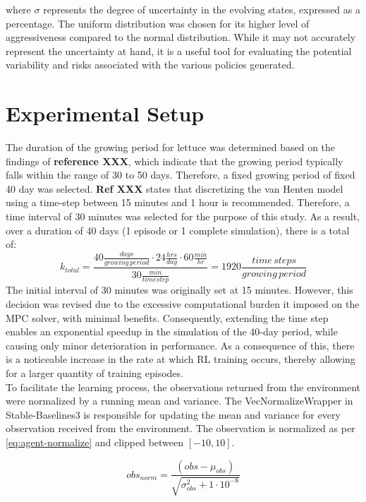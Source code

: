 where $\sigma$ represents the degree of uncertainty in the evolving states, expressed as a percentage. The uniform distribution was chosen for its higher level of aggressiveness compared to the normal distribution. While it may not accurately represent the uncertainty at hand, it is a useful tool for evaluating the potential variability and risks associated with the various policies generated.



\section{Experimental Setup}
The duration of the growing period for lettuce was determined based on the findings of \textbf{reference XXX}, which indicate that the growing period typically falls within the range of 30 to 50 days. Therefore, a fixed growing period of fixed 40 day was selected. \textbf{Ref XXX} states that discretizing the van Henten model using a time-step between 15 minutes and 1 hour is recommended. Therefore, a time interval of 30 minutes was selected for the purpose of this study. As a result, over a duration of 40 days (1 episode or 1 complete simulation), there is a total of:
$$
k_{total} = \frac{40 \frac{days}{growing \, period} \cdot 24 \frac{hrs}{day} \cdot 60 \frac{min}{hr}}{30 \frac{min}{timestep}} = 1920 \frac{time \, steps}{growing \, period}
$$
The initial interval of 30 minutes was originally set at 15 minutes. However, this decision was revised due to the excessive computational burden it imposed on the MPC solver, with minimal benefits. Consequently, extending the time step enables an exponential speedup in the simulation of the 40-day period, while causing only minor deterioration in performance. As a consequence of this, there is a noticeable increase in the rate at which RL training occurs, thereby allowing for a larger quantity of training episodes.
\\
To facilitate the learning process, the observations returned from the environment were normalized by a running mean and variance. The VecNormalizeWrapper in Stable-Baselines3 is responsible for updating the mean and variance for every observation received from the environment. The observation is normalized as per \autoref{eq:agent-normalize} and clipped between $[-10,10]$.

\begin{equation}
    \label{eq:agent-normalize}
    obs_{norm} = \frac{(obs - \mu_{obs}) }{\sqrt{\sigma^2_{obs} + 1\cdot 10^{-8}}}
\end{equation}

